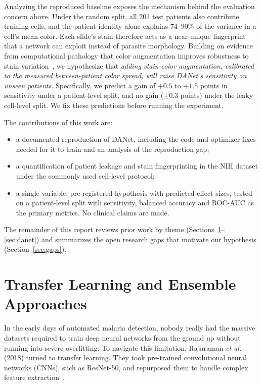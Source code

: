\documentclass[conference]{IEEEtran}
\begin{document}
Analyzing the reproduced baseline exposes the mechanism behind the evaluation concern
above. Under the random split, all 201 test patients also contribute training cells,
and the patient identity alone explains 74--90\% of the variance in a cell's mean
color. Each slide's stain therefore acts as a near-unique fingerprint that a network
can exploit instead of parasite morphology. Building on evidence from computational
pathology that color augmentation improves robustness to stain
variation~\cite{tellez2019}, we hypothesize that \emph{adding stain-color
augmentation, calibrated to the measured between-patient color spread, will raise
DANet's sensitivity on unseen patients}. Specifically, we predict a gain of $+0.5$ to
$+1.5$ points in sensitivity under a patient-level split, and no gain ($\pm0.3$ points)
under the leaky cell-level split. We fix these predictions before running the
experiment.

The contributions of this work are:
\begin{itemize}
\item a documented reproduction of DANet, including the code and optimizer fixes
needed for it to train and an analysis of the reproduction gap;
\item a quantification of patient leakage and stain fingerprinting in the NIH dataset
under the commonly used cell-level protocol;
\item a single-variable, pre-registered hypothesis with predicted effect sizes, tested
on a patient-level split with sensitivity, balanced accuracy and ROC-AUC as the
primary metrics. No clinical claims are made.
\end{itemize}
The remainder of this report reviews prior work by theme
(Sections~\ref{sec:transfer}--\ref{sec:danet}) and summarizes the open research
gaps that motivate our hypothesis (Section~\ref{sec:gaps}).

\section{Transfer Learning and Ensemble Approaches}\label{sec:transfer}
In the early days of automated malaria detection, nobody really had the massive
datasets required to train deep neural networks from the ground up without running
into severe overfitting. To navigate this limitation, Rajaraman \emph{et al.} (2018)
turned to transfer learning. They took pre-trained convolutional neural networks
(CNNs), such as ResNet-50, and repurposed them to handle complex feature
extraction~\cite{rajaraman2018}.
\end{document}
